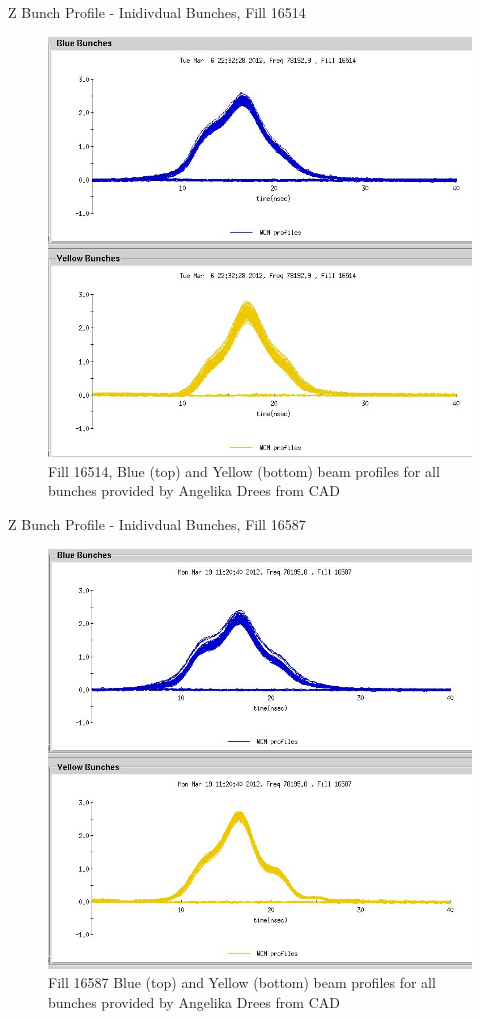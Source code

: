 \begin{frame}{Z Bunch Profile - Inidivdual Bunches, Fill 16514}
\begin{figure}
\begin{center}
\includegraphics[width=0.5\linewidth]{../ZBunchProfileStudies/figs/wcm_16514.jpeg}
\end{center}
\caption{ Fill 16514, Blue (top) and Yellow (bottom) beam profiles for all bunches provided by Angelika Drees from CAD}
\label{fig:wcm_16514}
\end{figure}
\end{frame}

\begin{frame}{Z Bunch Profile - Inidivdual Bunches, Fill 16587}
\begin{figure}
\begin{center}
\includegraphics[width=0.5\linewidth]{../ZBunchProfileStudies/figs/wcm_16587.jpeg}
\end{center}
\caption{ Fill 16587 Blue (top) and Yellow (bottom) beam profiles for all bunches provided by Angelika Drees from CAD}
\label{fig:wcm_16587}
\end{figure}
\end{frame}

